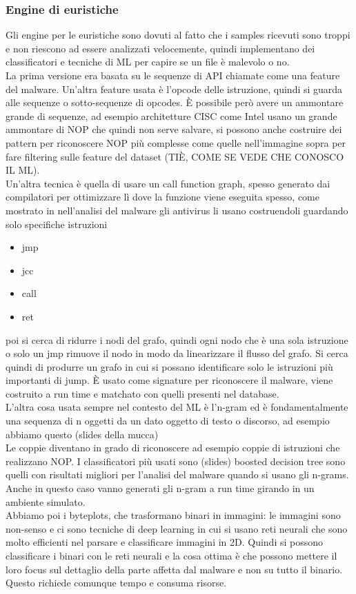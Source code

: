 \documentclass[12pt, oneside]{extbook} %
\begin{document}
\subsubsection{Engine di euristiche}
Gli engine per le euristiche sono dovuti al fatto che i samples ricevuti sono troppi e non riescono ad essere analizzati velocemente, quindi implementano dei classificatori e tecniche di ML per capire se un file è malevolo o no.\\La prima versione era basata su le sequenze di API chiamate come una feature del malware. Un'altra feature usata è l'opcode delle istruzione, quindi si guarda alle sequenze o sotto-sequenze di opcodes. È possibile però avere un ammontare grande di sequenze, ad esempio architetture CISC come Intel usano un grande ammontare di NOP che quindi non serve salvare, si possono anche costruire dei pattern per riconoscere NOP più complesse come quelle nell'immagine sopra per fare filtering sulle feature del dataset (TIÈ, COME SE VEDE CHE CONOSCO IL ML).\\Un'altra tecnica è quella di usare un call function graph, spesso generato dai compilatori per ottimizzare lì dove la funzione viene eseguita spesso, come mostrato in
nell'analisi del malware gli antivirus li usano costruendoli guardando solo specifiche istruzioni
\begin{itemize}
\item jmp
\item jcc
\item call
\item ret
\end{itemize}
poi si cerca di ridurre i nodi del grafo, quindi ogni nodo che è una sola istruzione o solo un jmp rimuove il nodo in modo da linearizzare il flusso del grafo. Si cerca quindi di produrre un grafo in cui si possano identificare solo le istruzioni più importanti di jump. È usato come signature per riconoscere il malware, viene costruito a run time e matchato con quelli presenti nel database.\\L'altra cosa usata sempre nel contesto del ML è l'n-gram ed è fondamentalmente una sequenza di n oggetti da un dato oggetto di testo o discorso, ad esempio abbiamo questo (slides della mucca)\\Le coppie diventano in grado di riconoscere ad esempio coppie di istruzioni che realizzano NOP. I classificatori più usati sono
(slides)
boosted decision tree sono quelli con risultati migliori per l'analisi del malware quando si usano gli n-grams. Anche in questo caso vanno generati gli n-gram a run time girando in un ambiente simulato.\\Abbiamo poi i byteplots, che trasformano binari in immagini: le immagini sono non-senso e ci sono tecniche di deep learning in cui si usano reti neurali che sono molto efficienti nel parsare e classificare immagini in 2D. Quindi si possono classificare i binari con le reti neurali e la cosa ottima è che possono mettere il loro focus sul dettaglio della parte affetta dal malware e non su tutto il binario. Questo richiede comunque tempo e consuma risorse.
\end{document}
